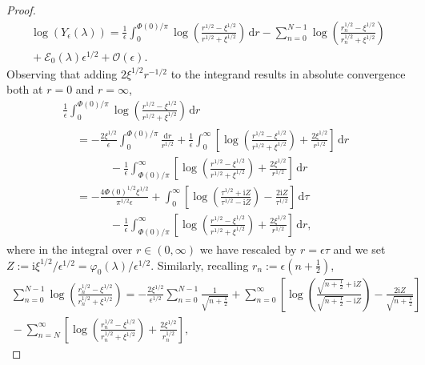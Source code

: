 \documentclass[12pt]{amsart}
\numberwithin{equation}{section}
\newcommand{\dd}{\mathrm{d}}
\newcommand{\ii}{\mathrm{i}}
\newcommand{\SP}{\lambda}
\newcommand{\phaseint}{\Phi}
\newcommand{\rr}{r}
\newcommand{\bigo}[1]{ \mathcal{O}\! \left( #1 \right) }
\begin{document}
\begin{proof}
\begin{multline}
\log(Y_\epsilon(\SP))=\frac{1}{\epsilon}\int_0^{\phaseint(0)/\pi}\log\left(\frac{\rr^{1/2}-\xi^{1/2}}{\rr^{1/2}+\xi^{1/2}}\right)\,\dd \rr - \sum_{n=0}^{N-1}\log\left(\frac{\rr_n^{1/2}-\xi^{1/2}}{\rr_n^{1/2}+\xi^{1/2}}\right)\\
{}+\mathcal{E}_0(\SP)\epsilon^{1/2} + \bigo{\epsilon}.
\label{eq:logY-again}
\end{multline}
Observing that adding $2\xi^{1/2}\rr^{-1/2}$ to the integrand results in absolute convergence both at $\rr=0$ and $\rr=\infty$, 
\begin{multline}
\frac{1}{\epsilon}\int_0^{\phaseint(0)/\pi}\log\left(\frac{\rr^{1/2}-\xi^{1/2}}{\rr^{1/2}+\xi^{1/2}}\right)\,\dd \rr
\\
\begin{aligned}
&= -\frac{2\xi^{1/2}}{\epsilon}\int_0^{\phaseint(0)/\pi}\frac{\dd \rr}{\rr^{1/2}} + 
\frac{1}{\epsilon}\int_0^\infty\left[\log\left(\frac{\rr^{1/2}-\xi^{1/2}}{\rr^{1/2}+\xi^{1/2}}\right) +\frac{2\xi^{1/2}}{\rr^{1/2}}\right]\,\dd \rr \\
&\quad\quad\quad{}-\frac{1}{\epsilon}\int_{\phaseint(0)/\pi}^\infty
\left[\log\left(\frac{\rr^{1/2}-\xi^{1/2}}{\rr^{1/2}+\xi^{1/2}}\right) +\frac{2\xi^{1/2}}{\rr^{1/2}}\right]\,\dd \rr
\\
&=-\frac{4\phaseint(0)^{1/2}\xi^{1/2}}{\pi^{1/2}\epsilon}+\int_0^\infty\left[\log\left(\frac{\tau^{1/2}+\ii Z}{\tau^{1/2}-\ii Z}\right)-\frac{2\ii Z}{\tau^{1/2}}\right]\,\dd\tau\\
&\quad\quad\quad{}-\frac{1}{\epsilon}\int_{\phaseint(0)/\pi}^\infty
\left[\log\left(\frac{\rr^{1/2}-\xi^{1/2}}{\rr^{1/2}+\xi^{1/2}}\right) +\frac{2\xi^{1/2}}{\rr^{1/2}}\right]\,\dd \rr,
\end{aligned}
\end{multline}
where in the integral over $\rr\in (0,\infty)$ we have rescaled by $\rr=\epsilon\tau$ and we set $Z:=\ii\xi^{1/2}/\epsilon^{1/2}=\varphi_0(\SP)/\epsilon^{1/2}$.  Similarly, recalling $\rr_n:=\epsilon(n+\tfrac{1}{2})$,
\begin{multline}
\sum_{n=0}^{N-1}\log\left(\frac{\rr_n^{1/2}-\xi^{1/2}}{\rr_n^{1/2}+\xi^{1/2}}\right)
=-\frac{2\xi^{1/2}}{\epsilon^{1/2}}\sum_{n=0}^{N-1}\frac{1}{\sqrt{n+\tfrac{1}{2}}} 
+ \sum_{n=0}^\infty\left[\log\left(\frac{\sqrt{n+\tfrac{1}{2}}+\ii Z}{\sqrt{n+\tfrac{1}{2}}-\ii Z}\right)-\frac{2\ii Z}{\sqrt{n+\tfrac{1}{2}}}\right]
\\
{}- \sum_{n=N}^\infty\left[\log\left(\frac{\rr_n^{1/2}-\xi^{1/2}}{\rr_n^{1/2}+\xi^{1/2}}\right)+\frac{2\xi^{1/2}}{\rr_n^{1/2}}\right],
\end{multline}

\end{proof}
\end{document}
